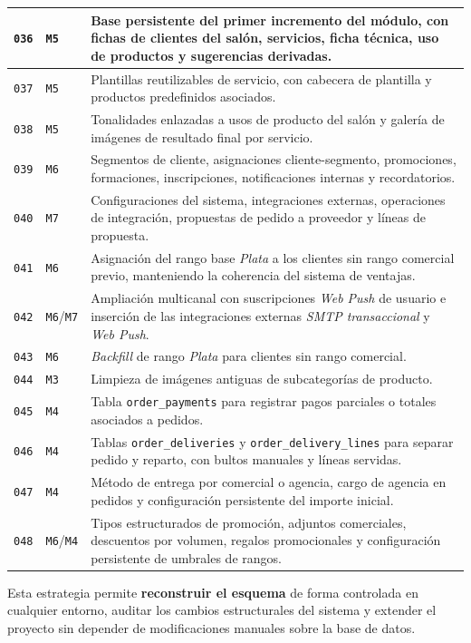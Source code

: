 {\begin{supertabular}{|>{\raggedright\arraybackslash}p{0.14\textwidth}|>{\raggedright\arraybackslash}p{0.16\textwidth}|>{\raggedright\arraybackslash}p{0.62\textwidth}|}
\hline
\texttt{036} & \texttt{M5} & Base persistente del primer incremento del módulo, con fichas de clientes del salón, servicios, ficha técnica, uso de productos y sugerencias derivadas.\\
\hline
\texttt{037} & \texttt{M5} & Plantillas reutilizables de servicio, con cabecera de plantilla y productos predefinidos asociados.\\
\hline
\texttt{038} & \texttt{M5} & Tonalidades enlazadas a usos de producto del salón y galería de imágenes de resultado final por servicio.\\
\hline
\texttt{039} & \texttt{M6} & Segmentos de cliente, asignaciones cliente-segmento, promociones, formaciones, inscripciones, notificaciones internas y recordatorios.\\
\hline
\texttt{040} & \texttt{M7} & Configuraciones del sistema, integraciones externas, operaciones de integración, propuestas de pedido a proveedor y líneas de propuesta.\\
\hline
\texttt{041} & \texttt{M6} & Asignación del rango base \textit{Plata} a los clientes sin rango comercial previo, manteniendo la coherencia del sistema de ventajas.\\
\hline
\texttt{042} & \texttt{M6}/\texttt{M7} & Ampliación multicanal con suscripciones \textit{Web Push} de usuario e inserción de las integraciones externas \textit{SMTP transaccional} y \textit{Web Push}.\\
\hline
\texttt{043} & \texttt{M6} & \textit{Backfill} de rango \textit{Plata} para clientes sin rango comercial.\\
\hline
\texttt{044} & \texttt{M3} & Limpieza de imágenes antiguas de subcategorías de producto.\\
\hline
\texttt{045} & \texttt{M4} & Tabla \texttt{order\_payments} para registrar pagos parciales o totales asociados a pedidos.\\
\hline
\texttt{046} & \texttt{M4} & Tablas \texttt{order\_deliveries} y \texttt{order\_delivery\_lines} para separar pedido y reparto, con bultos manuales y líneas servidas.\\
\hline
\texttt{047} & \texttt{M4} & Método de entrega por comercial o agencia, cargo de agencia en pedidos y configuración persistente del importe inicial.\\
\hline
\texttt{048} & \texttt{M6}/\texttt{M4} & Tipos estructurados de promoción, adjuntos comerciales, descuentos por volumen, regalos promocionales y configuración persistente de umbrales de rangos.\\
\hline
\end{supertabular}
}

Esta estrategia permite \textbf{reconstruir el esquema} de forma controlada en cualquier entorno, auditar los cambios estructurales del sistema y extender el proyecto sin depender de modificaciones manuales sobre la base de datos.

